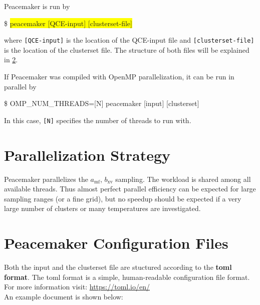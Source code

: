 \documentclass{scrartcl}
\newcommand{\amf}{a_\mathrm{mf}}
\newcommand{\bxv}{b_\mathrm{xv}}
\begin{document}
Peacemaker is run by
\begin{addmargin}[1cm]{0cm}
    \ttfamily
    \$ \colorbox{yellow}{peacemaker [QCE-input] [clusterset-file]}
\end{addmargin}
where \texttt{[QCE-input]} is the location of the QCE-input file and \texttt{[clusterset-file]} 
is the location of the clusterset file.
The structure of both files will be explained in \cref{sec:config}.

If Peacemaker was compiled with OpenMP parallelization, it can be run in parallel by
\begin{addmargin}[1cm]{0cm}
    \ttfamily
    \$ OMP\_NUM\_THREADS=[N] peacemaker [input] [clusterset]
\end{addmargin}
In this case, \texttt{[N]} specifies the number of threads to run with.

\newpage

\section{Parallelization Strategy}

Peacemaker parallelizes the $\amf$, $\bxv$ sampling.
The workload is shared among all available threads.
Thus almost perfect parallel efficiency can be expected for large sampling ranges (or a fine grid), 
but no speedup should be expected
if a very large number of clusters or many temperatures are investigated.

\section{Peacemaker Configuration Files}
\label{sec:config}

Both the input and the clusterset file are stuctured according to the \textbf{toml format}.
The toml format is a simple, human-readable configuration file format.
For more information visit: \url{https://toml.io/en/}\\
An example document is shown below:
\end{document}
